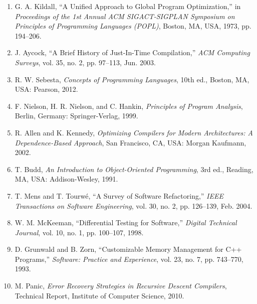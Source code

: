 \begin{enumerate}
    \item G. A. Kildall, ``A Unified Approach to Global Program Optimization,'' in \textit{Proceedings of the 1st Annual ACM SIGACT-SIGPLAN Symposium on Principles of Programming Languages (POPL)}, Boston, MA, USA, 1973, pp. 194--206.
    
    \item J. Aycock, ``A Brief History of Just-In-Time Compilation,'' \textit{ACM Computing Surveys}, vol. 35, no. 2, pp. 97--113, Jun. 2003.
    
    \item R. W. Sebesta, \textit{Concepts of Programming Languages}, 10th ed., Boston, MA, USA: Pearson, 2012.
    
    \item F. Nielson, H. R. Nielson, and C. Hankin, \textit{Principles of Program Analysis}, Berlin, Germany: Springer-Verlag, 1999.
    
    \item R. Allen and K. Kennedy, \textit{Optimizing Compilers for Modern Architectures: A Dependence-Based Approach}, San Francisco, CA, USA: Morgan Kaufmann, 2002.
    
    \item T. Budd, \textit{An Introduction to Object-Oriented Programming}, 3rd ed., Reading, MA, USA: Addison-Wesley, 1991.
    
    \item T. Mens and T. Tourwé, ``A Survey of Software Refactoring,'' \textit{IEEE Transactions on Software Engineering}, vol. 30, no. 2, pp. 126--139, Feb. 2004.
    
    \item W. M. McKeeman, ``Differential Testing for Software,'' \textit{Digital Technical Journal}, vol. 10, no. 1, pp. 100--107, 1998.
    
    \item D. Grunwald and B. Zorn, ``Customizable Memory Management for C++ Programs,'' \textit{Software: Practice and Experience}, vol. 23, no. 7, pp. 743--770, 1993.
    
    \item M. Panic, \textit{Error Recovery Strategies in Recursive Descent Compilers}, Technical Report, Institute of Computer Science, 2010.
\end{enumerate}
\newpage
